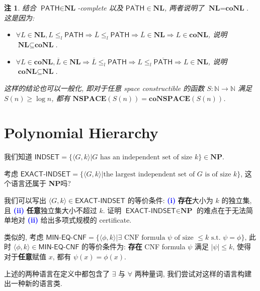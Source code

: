 \documentclass[8pt]{article}
\theoremstyle{compact}
\newtheorem{remark}{注}[section]
\def\num#1{\textnormal{\textbf{\mbox{\textcolor{blue}{(#1)}}}}}
\def\le{\leqslant}
\def\ge{\geqslant}
\def\NP{\textbf{NP}}
\def\NSPACE{\textbf{NSPACE}}
\def\NL{\textbf{NL}}
\def\coNL{\textbf{coNL}}
\begin{document}
\begin{remark}
	结合 $\textsf{PATH} \in \NL$-complete 以及 $\overline{\textsf{PATH}} \in \NL$, 两者说明了 $\NL = \coNL$. 这是因为:
	\begin{itemize}
		\item $\forall L \in \NL, L \le_l \textsf{PATH} \Rightarrow \overline{L} \le_l \overline{\textsf{PATH}} \Rightarrow \overline{L} \in \NL \Rightarrow L \in \coNL$, 说明 $\NL \subseteq \coNL$.
		\item $\forall L \in \coNL, \overline{L} \in \NL \Rightarrow \overline{L} \le_l \textsf{PATH} \Rightarrow L \le_l \overline{\textsf{PATH}} \Rightarrow L \in \NL$, 说明 $\coNL \subseteq \NL$.
	\end{itemize}
	
	这样的结论也可以一般化, 即对于任意 space constructible 的函数 $S : \mathbb N \to \mathbb N$ 满足 $S(n) \ge \log n$, 都有 $\NSPACE(S(n)) = \textbf{coNSPACE}(S(n))$.
\end{remark}



\newpage
\section{Polynomial Hierarchy}

我们知道 $\textsf{INDSET} = \{\langle G, k \rangle | G \text{ has an independent set of size } k\} \in \NP$. 

考虑 $\textsf{EXACT-INDSET} = \{\langle G, k \rangle | \text{the largest independent set of } G \text{ is of size } k\}$, 这个语言还属于 \NP 吗?

我们可以写出 $\langle G, k \rangle \in \textsf{EXACT-INDSET}$ 的等价条件: \num{i} \textbf{存在}大小为 $k$ 的独立集, 且 \num{ii} \textbf{任意}独立集大小不超过 $k$. 证明 $\textsf{EXACT-INDSET} \in \NP$ 的难点在于无法简单地对 \num{ii} 给出多项式规模的 certificate.

类似的, 考虑 $\textsf{MIN-EQ-CNF} = \{\langle\phi, k\rangle | \exists \text{ CNF formula } \psi \text{ of size } \le k \text{ s.t. } \psi = \phi\}$, 此时 $\langle \phi, k \rangle \in \textsf{MIN-EQ-CNF}$ 的等价条件为: \textbf{存在} CNF formula $\psi$ 满足 $|\psi| \le k$, 使得对于\textbf{任意}赋值 $x$, 都有 $\psi(x) = \phi(x)$.

上述的两种语言在定义中都包含了 $\exists$ 与 $\forall$ 两种量词, 我们尝试对这样的语言构建出一种新的语言类.
\end{document}
